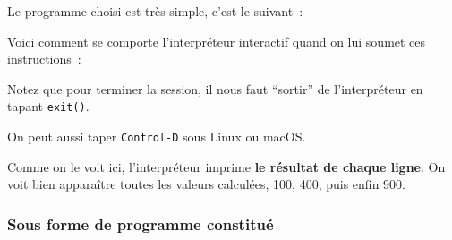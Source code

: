     Le programme choisi est très simple, c'est le suivant~:

    \begin{Shaded}
\begin{Highlighting}[frame=lines,framerule=0.6mm,rulecolor=\color{asisframecolor}]
 \OperatorTok{*} 
 \OperatorTok{*} 
 \OperatorTok{*} 
\end{Highlighting}
\end{Shaded}

    Voici comment se comporte l'interpréteur interactif quand on lui soumet
ces instructions~:

    \begin{Shaded}
\begin{Highlighting}[frame=lines,framerule=0.6mm,rulecolor=\color{asisframecolor}]
 \NormalTok{, }\NormalTok{:}\NormalTok{:}\NormalTok{)}
\NormalTok{[GCC }\NormalTok{)] on darwin}
\NormalTok{, }\NormalTok{, }   
\OperatorTok{>>>}  \OperatorTok{*} 
\OperatorTok{>>>}  \OperatorTok{*} 
\OperatorTok{>>>}  \OperatorTok{*} 
\OperatorTok{>>>}
\NormalTok{$}
\end{Highlighting}
\end{Shaded}

    Notez que pour terminer la session, il nous faut ``sortir'' de
l'interpréteur en tapant \texttt{exit()}.

On peut aussi taper \texttt{Control-D} sous Linux ou macOS.

    Comme on le voit ici, l'interpréteur imprime \textbf{le résultat de
chaque ligne}. On voit bien apparaître toutes les valeurs calculées,
100, 400, puis enfin 900.

    \hypertarget{sous-forme-de-programme-constituuxe9}{%
\subsubsection{Sous forme de programme
constitué}\label{sous-forme-de-programme-constituuxe9}}

